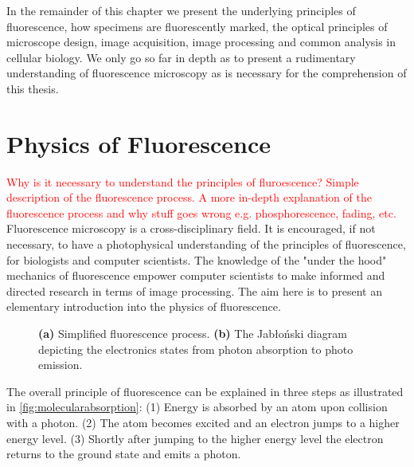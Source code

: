 In the remainder of this chapter we present the underlying principles of fluorescence, how specimens are fluorescently marked, the optical principles of microscope design, image acquisition, image processing and common analysis in cellular biology.
We only go so far in depth as to present a rudimentary understanding of fluorescence microscopy as is necessary for the comprehension of this thesis.


\section{Physics of Fluorescence}
\label{sec:PhysicsOfFluorescence}

\textcolor{red}{Why is it necessary to understand the principles of fluroescence? Simple description of the fluorescence process. A more in-depth explanation of the fluorescence process and why stuff goes wrong  e.g. phosphorescence, fading, etc.}
Fluorescence microscopy is a cross-disciplinary field.
It is encouraged, if not necessary, to have a photophysical understanding of the principles of fluorescence, for biologists and computer scientists.
The knowledge of the "under the hood" mechanics of fluorescence empower computer scientists to make informed and directed research in terms of image processing.
The aim here is to present an elementary introduction into the physics of fluorescence.

\begin{figure}[!t]
	\centering
	\caption{\textbf{(a)} Simplified fluorescence process. \textbf{(b)} The Jab{\l}o{\'n}ski diagram depicting the electronics states from photon absorption to photo emission.}
	\label{fig:fluorescence_electron_states}
\end{figure}

The overall principle of fluorescence can be explained in three steps \citep{Nobel2016} as illustrated in \autoref{fig:molecularabsorption}: 
(1) Energy is absorbed by an atom upon collision with a photon.
(2) The atom becomes excited and an electron jumps to a higher energy level.
(3) Shortly after jumping to the higher energy level the electron returns to the ground state and emits a photon.

